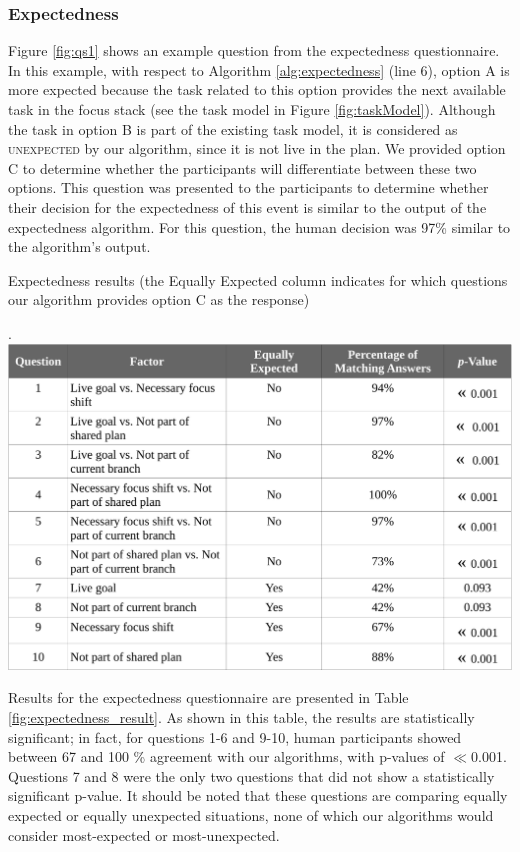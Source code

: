 \documentclass[12pt]{report}
\begin{document}
\subsubsection{Expectedness}
\label{sec:expectedness-crowdsourcing}
Figure \ref{fig:qs1} shows an example question from the expectedness
questionnaire. In this example, with respect to Algorithm \ref{alg:expectedness}
(line 6), option A is more expected because the task related to this option
provides the next available task in the focus stack (see the task model in
Figure \ref{fig:taskModel}). Although the task in option B is part of the
existing task model, it is considered as \textsc{unexpected} by our algorithm,
since it is not live in the plan. We provided option C to determine whether the
participants will differentiate between these two options. This question was
presented to the participants to determine whether their decision for the
expectedness of this event is similar to the output of the expectedness
algorithm. For this question, the human decision was 97\% similar to the
algorithm's output.

\vspace*{3mm}
\begin{table}[tbh]
  \centering
  \caption{Expectedness results (the Equally Expected column indicates
  for which questions our algorithm provides option C as the response)}.
  \label{fig:expectedness_result}
  \vspace*{-3mm}
  \includegraphics[width=1\textwidth]{figure/expectedness_result_croped.pdf}
\end{table}

Results for the expectedness questionnaire are presented in Table
\ref{fig:expectedness_result}. As shown in this table, the results are
statistically significant; in fact, for questions 1-6 and 9-10, human
participants showed between 67 and 100 \% agreement with our algorithms, with
p-values of $\ll$0.001. Questions 7 and 8 were the only two questions that did
not show a statistically significant p-value. It should be noted that these
questions are comparing equally expected or equally unexpected situations, none
of which our algorithms would consider most-expected or most-unexpected.
\end{document}
